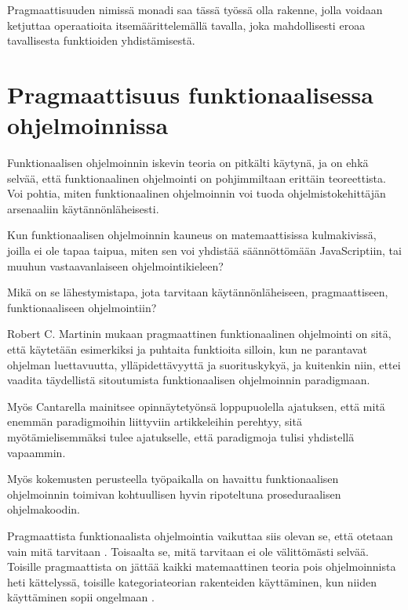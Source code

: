 Pragmaattisuuden nimissä monadi saa tässä työssä olla rakenne, jolla voidaan ketjuttaa operaatioita itsemäärittelemällä tavalla, joka mahdollisesti eroaa tavallisesta funktioiden yhdistämisestä.


\section{Pragmaattisuus funktionaalisessa ohjelmoinnissa}

Funktionaalisen ohjelmoinnin iskevin teoria on pitkälti käytynä, ja on ehkä selvää, että funktionaalinen ohjelmointi on pohjimmiltaan erittäin teoreettista. Voi pohtia, miten funktionaalinen ohjelmoinnin voi tuoda ohjelmistokehittäjän arsenaaliin käytännönläheisesti.

Kun funktionaalisen ohjelmoinnin kauneus on matemaattisissa kulmakivissä, joilla ei ole tapaa taipua, miten sen voi yhdistää säännöttömään JavaScriptiin, tai muuhun vastaavanlaiseen ohjelmointikieleen?

Mikä on se lähestymistapa, jota tarvitaan käytännönläheiseen, pragmaattiseen, funktionaaliseen ohjelmointiin?

Robert C. Martinin mukaan pragmaattinen funktionaalinen ohjelmointi on sitä, että käytetään esimerkiksi  ja puhtaita funktioita silloin, kun ne parantavat ohjelman luettavuutta, ylläpidettävyyttä ja suorituskykyä, ja kuitenkin niin, ettei vaadita täydellistä sitoutumista funktionaalisen ohjelmoinnin paradigmaan. \citep{martin2017pragmaticfp}

Myös Cantarella mainitsee opinnäytetyönsä loppupuolella ajatuksen, että mitä enemmän paradigmoihin liittyviin artikkeleihin perehtyy, sitä myötämielisemmäksi tulee ajatukselle, että paradigmoja tulisi yhdistellä vapaammin. \citep[45]{cantarella_fp_haitat}

Myös kokemusten perusteella työpaikalla on havaittu funktionaalisen ohjelmoinnin toimivan kohtuullisen hyvin ripoteltuna proseduraalisen ohjelmakoodin.

Pragmaattista funktionaalista ohjelmointia vaikuttaa siis olevan se, että otetaan vain mitä tarvitaan \cite{dear_functional_bros,martin2017pragmaticfp,cantarella_fp_haitat}. Toisaalta se, mitä tarvitaan ei ole välittömästi selvää. Toisille pragmaattista on jättää kaikki matemaattinen teoria pois ohjelmoinnista heti kättelyssä, toisille kategoriateorian rakenteiden käyttäminen, kun niiden käyttäminen sopii ongelmaan \cite{holvikari2021category,martin2017pragmaticfp}.

